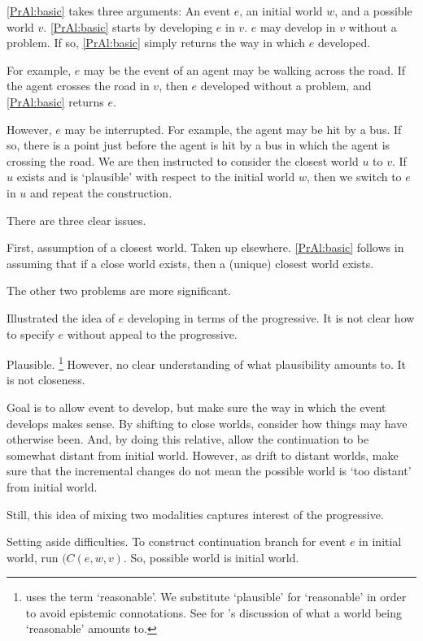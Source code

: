 \begin{note}
  \autoref{PrAl:basic} takes three arguments:
  An event \(e\), an initial world \(w\), and a possible world \(v\).
  \autoref{PrAl:basic} starts by developing \(e\) in \(v\).
  \(e\) may develop in \(v\) without a problem.
  If so, \autoref{PrAl:basic} simply returns the way in which \(e\) developed.

  For example, \(e\) may be the event of an agent may be walking across the road.
  If the agent crosses the road in \(v\), then \(e\) developed without a problem, and \autoref{PrAl:basic} returns \(e\).

  However, \(e\) may be interrupted.
  For example, the agent may be hit by a bus.
  If so, there is a point just before the agent is hit by a bus in which the agent is crossing the road.
  We are then instructed to consider the closest world \(u\) to \(v\).
  If \(u\) exists and is `plausible' with respect to the initial world \(w\), then we switch to \(e\) in \(u\) and repeat the construction.

  There are three clear issues.

  First, assumption of a closest world.
  Taken up elsewhere.
  \autoref{PrAl:basic} follows \citeauthor{Landman:1992wh} in assuming that if a close world exists, then a (unique) closest world exists.

  The other two problems are more significant.

  Illustrated the idea of \(e\) developing in terms of the progressive.
  It is not clear how to specify \(e\) without appeal to the progressive.

  Plausible.%
  \footnote{
    \citeauthor{Landman:1992wh} uses the term `reasonable'.
    We substitute `plausible' for `reasonable' in order to avoid epistemic connotations.
    See \textcite[17--19,24--26]{Landman:1992wh} for \citeauthor{Landman:1992wh}'s discussion of what a world being `reasonable' amounts to.
  }
  However, no clear understanding of what plausibility amounts to.
  It is not closeness.

  Goal is to allow event to develop, but make sure the way in which the event develops makes sense.
  By shifting to close worlds, consider how things may have otherwise been.
  And, by doing this relative, allow the continuation to be somewhat distant from initial world.
  However, as drift to distant worlds, make sure that the incremental changes do not mean the possible world is `too distant' from initial world.

  Still, this idea of mixing two modalities captures interest of the progressive.

  Setting aside difficulties.
  To construct continuation branch for event \(e\) in initial world, run \((C(e,w,v)\).
  So, possible world is initial world.
\end{note}

